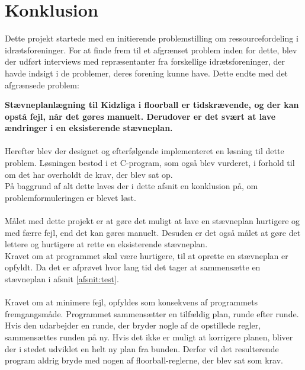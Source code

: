 \chapter{Konklusion}\label{ch:konklusion}

Dette projekt startede med en initierende problemstilling om ressourcefordeling i idrætsforeninger. For at finde frem til et afgrænset problem inden for dette, blev der udført interviews med repræsentanter fra forskellige idrætsforeninger, der havde indsigt i de problemer, deres forening kunne have. Dette endte med det afgrænsede problem:
\par
\textbf{Stævneplanlægning til Kidzliga i floorball er tidskrævende, og der kan opstå fejl, når det gøres manuelt. Derudover er det svært at lave ændringer i en eksisterende stævneplan.}
\\\\
Herefter blev der designet og efterfølgende implementeret en løsning til dette problem. Løsningen bestod i et C-program, som også blev vurderet, i forhold til om det har overholdt de krav, der blev sat op.
\\
På baggrund af alt dette laves der i dette afsnit en konklusion på, om problemformuleringen er blevet løst.
\\\\
Målet med dette projekt er at gøre det muligt at lave en stævneplan hurtigere og med færre fejl, end det kan gøres manuelt. Desuden er det også målet at gøre det lettere og hurtigere at rette en eksisterende stævneplan.
\\
Kravet om at programmet skal være hurtigere, til at oprette en stævneplan er opfyldt. Da det er afprøvet hvor lang tid det tager at sammensætte en stævneplan i afsnit \ref{afsnit:test}. 
\\\\
Kravet om at minimere fejl, opfyldes som konsekvens af programmets fremgangsmåde. Programmet sammensætter en tilfældig plan, runde efter runde. Hvis den udarbejder en runde, der bryder nogle af de opstillede regler, sammensættes runden på ny. Hvis det ikke er muligt at korrigere planen, bliver der i stedet udviklet en helt ny plan fra bunden. Derfor vil det resulterende program aldrig bryde med nogen af floorball-reglerne, der blev sat som krav. 
\\\\
